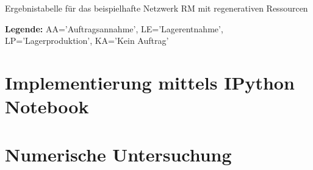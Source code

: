 \begin{table}
\begin{footnotesize}
    \caption{Ergebnistabelle für das beispielhafte Netzwerk RM mit regenerativen Ressourcen} \label{Tab6}
    \vspace*{3mm}
    \begin{center}
      {\footnotesize \textbf{Legende:} AA='Auftragsannahme', LE='Lagerentnahme', LP='Lagerproduktion', KA='Kein Auftrag'} 
      \end{center}
\end{footnotesize}
\end{table}

\section{Implementierung mittels IPython Notebook}

\section{Numerische Untersuchung}